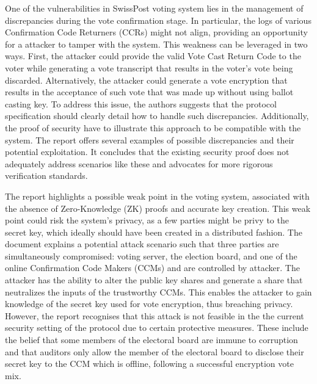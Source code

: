 One of the vulnerabilities in SwissPost voting system lies in the management of discrepancies during the vote confirmation stage. In particular, the logs of various Confirmation Code Returners (CCRs) might not align, providing an opportunity for a attacker to tamper with the system. This weakness can be leveraged in two ways. First, the attacker could provide the valid Vote Cast Return Code to the voter while generating a vote transcript that results in the voter's vote being discarded. Alternatively, the attacker could generate a vote encryption that results in the acceptance of such vote that was made up without using ballot casting key. To address this issue, the authors suggests that the protocol specification should clearly detail how to handle such discrepancies. Additionally, the proof of security have to illustrate this approach to be compatible with the system. The report offers several examples of possible discrepancies and their potential exploitation. It concludes that the existing security proof does not adequately address scenarios like these and advocates for more rigorous verification standards.

The report highlights a possible weak point in the voting system, associated with the absence of Zero-Knowledge (ZK) proofs and accurate key creation. This weak point could risk the system's privacy, as a few parties might be privy to the secret key, which ideally should have been created in a distributed fashion. The document explains a potential attack scenario such that three parties are simultaneously compromised:  voting server, the election board, and one of the online Confirmation Code Makers (CCMs) and are controlled by attacker. The attacker has the ability to alter the public key shares and generate a share that neutralizes the inputs of the trustworthy CCMs. This enables the attacker to gain knowledge of the secret key used for vote encryption, thus breaching privacy. However, the report recognises that this attack is not feasible in the the current security setting of the protocol due to certain protective measures. These include the belief that some members of the electoral board are immune to corruption and that auditors only allow the member of the electoral board to disclose their secret key to the CCM which is offline, following a successful encryption vote mix.

